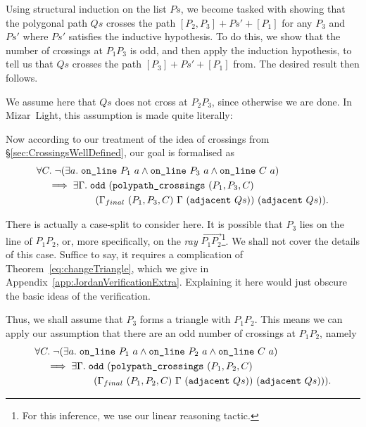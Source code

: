 Using structural induction on the list $Ps$, we become tasked with showing that the polygonal path $Qs$ crosses the path $[P_2,P_3] + Ps' + [P_1]$ for any $P_3$ and $Ps'$ where $Ps'$ satisfies the inductive hypothesis. To do this, we show that the number of crossings at $P_1P_3$ is odd, and then apply the induction hypothesis, to tell us that $Qs$ crosses the path $[P_3] + Ps' + [P_1]$ from. The desired result then follows.

We assume here that $Qs$ does not cross at $P_2P_3$, since otherwise we are done. In Mizar~Light, this assumption is made quite literally:

\begin{center}\end{center}

Now according to our treatment of the idea of crossings from \S\ref{sec:CrossingsWellDefined}, our goal is formalised as
\begin{equation*}
  \begin{aligned}
    &\forall C.\; \neg(\exists a.\; \texttt{on\_line}\ P_1\ a\wedge \texttt{on\_line}\ P_3\ a\wedge \texttt{on\_line}\ C\ a)\\
    &\quad \implies \exists \Gamma.\; \texttt{odd}\ (\texttt{polypath\_crossings}\ (P_1,P_3,C)\\
    &\qquad\qquad\qquad(\Gamma_{final}\ (P_1,P_3,C)\ \Gamma\ (\texttt{adjacent}\ Qs))\ (\texttt{adjacent}\ Qs)).
  \end{aligned}
\end{equation*}

There is actually a case-split to consider here. It is possible that $P_3$ lies on the line of $P_1P_2$, or, more specifically, on the \emph{ray} $\overrightarrow{P_1P_2}$\footnote{For this inference, we use our linear reasoning tactic.}. We shall not cover the details of this case. Suffice to say, it requires a complication of Theorem~\ref{eq:changeTriangle}, which we give in Appendix~\ref{app:JordanVerificationExtra}. Explaining it here would just obscure the basic ideas of the verification.

Thus, we shall assume that $P_3$ forms a triangle with $P_1P_2$. This means we can apply our assumption that there are an odd number of crossings at $P_1P_2$, namely
\begin{align*}&\forall C.\; \neg(\exists a.\; \texttt{on\_line}\ P_1\ a\wedge \texttt{on\_line}\ P_2\ a\wedge \texttt{on\_line}\ C\ a)\\
    &\quad\implies \exists \Gamma.\; \texttt{odd}\ (\texttt{polypath\_crossings}\ (P_1,P_2,C)\\
    &\qquad\qquad\qquad(\Gamma_{final}\ (P_1,P_2,C)\ \Gamma\ (\texttt{adjacent}\ Qs))\ (\texttt{adjacent}\ Qs))).
\end{align*}

